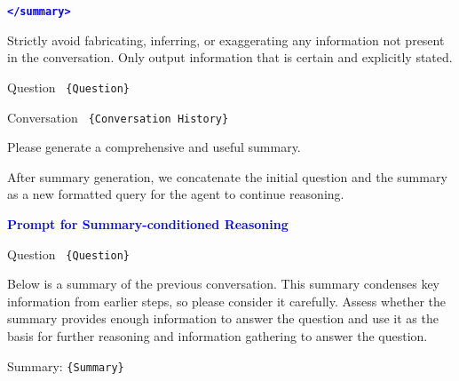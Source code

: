 \begin{tcolorbox}[colback=gray!5, colframe=black, boxrule=1pt, arc=2pt, left=5pt, right=5pt]
\begin{enumerate}
     \texttt{\textbf{\textcolor{blue}{</summary>}}} 
\end{enumerate}

Strictly avoid fabricating, inferring, or exaggerating any information not present in the conversation. Only output information that is certain and explicitly stated.

Question \texttt{ \{Question\} }

Conversation \texttt{ \{Conversation History\} }

Please generate a comprehensive and useful summary.
\end{tcolorbox}


After summary generation, we concatenate the initial question and the summary as a new formatted query for the agent to continue reasoning.

\begin{tcolorbox}[colback=gray!5, colframe=black, boxrule=1pt, arc=2pt, left=5pt, right=5pt]
\textbf{\textcolor{blue}{Prompt for Summary-conditioned Reasoning}} \vspace{5pt}

Question \texttt{ \{Question\} }

Below is a summary of the previous conversation. This summary condenses key information from earlier steps, so please consider it carefully. Assess whether the summary provides enough information to answer the question and use it as the basis for further reasoning and information gathering to answer the question.

Summary: \texttt{\{Summary\}}
\end{tcolorbox}

